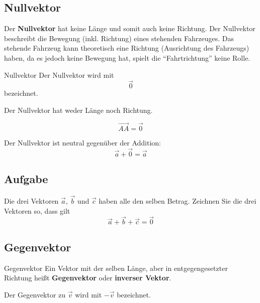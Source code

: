 \newpage

\subsection{Nullvektor}

Der \textbf{Nullvektor} hat keine Länge und somit auch keine
Richtung. Der Nullvektor beschreibt \zB die Bewegung (inkl.
Richtung) eines stehenden Fahrzeuges.
Das stehende Fahrzeug kann theoretisch eine Richtung (Ausrichtung des
Fahrzeugs) haben, da es jedoch keine Bewegung hat, spielt die
``Fahrtrichtung'' keine Rolle.

\begin{definition}{Nullvektor}{}
  Der Nullvektor wird mit
  $$\vec{0}$$
  bezeichnet.

  Der Nullvektor hat weder Länge noch Richtung.
\end{definition}

\begin{gesetz}{}{}
  $$\overrightarrow{AA} = \vec{0}$$
  \end{gesetz}

\begin{bemerkung}{}{}
  Der Nullvektor ist neutral gegenüber der Addition:
  $$\vec{a} + \vec{0}  = \vec{a}$$
\end{bemerkung}

\subsection*{Aufgabe}
Die drei Vektoren $\vec{a}$, $\vec{b}$ und $\vec{c}$ haben alle den
selben Betrag. Zeichnen Sie die drei Vektoren so, dass
gilt $$\vec{a}+\vec{b}+\vec{c} = \vec{0}$$

\newpage


\subsection{Gegenvektor}

\begin{definition}{Gegenvektor}{}
  Ein Vektor mit der selben Länge, aber in entgegengesetzter Richtung
  heißt \textbf{Gegenvektor} oder \textbf{inverser Vektor}.

  Der Gegenvektor zu $\vec{v}$ wird mit $-\vec{v}$ bezeichnet.
\end{definition}

